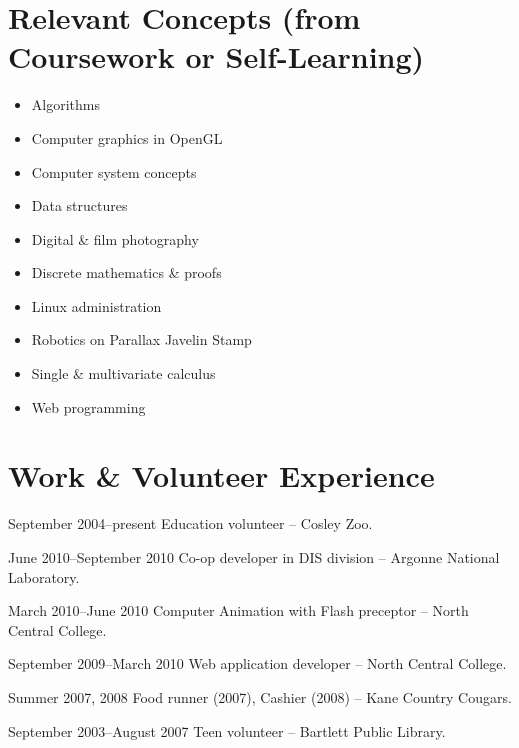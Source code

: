 \documentclass[12pt]{simplecv}
\begin{document}
  \section{Relevant Concepts (from Coursework or Self-Learning)}
  \begin{multicols}{2}
    \begin{itemize}
      \item Algorithms
      \item Computer graphics in OpenGL
      \item Computer system concepts
      \item Data structures
      \item Digital \& film photography
      \item Discrete mathematics \& proofs
      \item Linux administration
      \item Robotics on Parallax Javelin Stamp
      \item Single \& multivariate calculus
      \item Web programming
    \end{itemize}
  \end{multicols}

  \section{Work \& Volunteer Experience}
  \begin{topic}
    \item[September 2004--present] Education volunteer -- Cosley Zoo.
    \item[June 2010--September 2010] Co-op developer in DIS division -- Argonne National Laboratory.
    \item[March 2010--June 2010] Computer Animation with Flash preceptor -- North Central College.
    \item[September 2009--March 2010] Web application developer -- North Central College.
    \item[Summer 2007, 2008] Food runner (2007), Cashier (2008) -- Kane Country Cougars.
    \item[September 2003--August 2007] Teen volunteer -- Bartlett Public Library.
  \end{topic}
\end{document}

